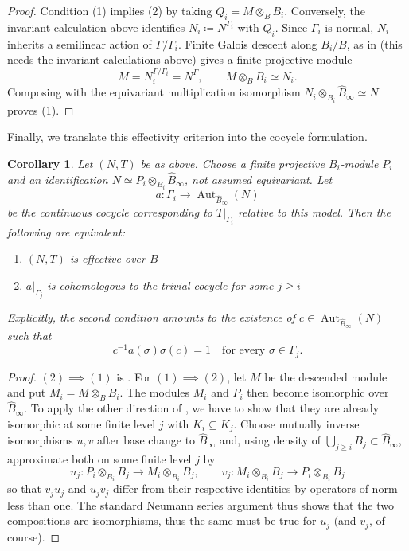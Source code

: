 \documentclass[10pt,twoside]{article}
\numberwithin{equation}{section}
\theoremstyle{plain}
\newtheorem{mycor}[mythm]{Corollary}
\theoremstyle{definition}
\DeclareMathOperator{\Aut}{Aut}
\begin{document}
\begin{proof}
Condition (1) implies (2) by taking \(Q_i=M\otimes_B B_i\). Conversely, the invariant calculation above identifies \(N_i\coloneqq N^{\Gamma_i}\) with \(Q_i\). Since \(\Gamma_i\) is normal, \(N_i\) inherits a semilinear action of \(\Gamma/\Gamma_i\). Finite Galois descent along \(B_i/B\), as in \cite[0CDQ and 058S]{Stacks} (this needs the invariant calculations above) gives a finite projective module
\[
M=N_i^{\Gamma/\Gamma_i}=N^\Gamma,
\qquad M\otimes_B B_i\simeq N_i.
\]
Composing with the equivariant multiplication isomorphism \(N_i\otimes_{B_i}\hat B_\infty\simeq N\) proves (1).
\end{proof}

Finally, we translate this effectivity criterion into the cocycle formulation.
\begin{mycor}\label{proposalLocalTriviality}
Let \((N,T)\) be as above. Choose a finite projective \(B_i\)-module \(P_i\) and an identification \(N\simeq P_i\otimes_{B_i}\hat B_\infty\), not assumed equivariant. Let
\[
a\colon\Gamma_i\longrightarrow\Aut_{\hat B_\infty}(N)
\]
be the continuous cocycle corresponding to \(T|_{\Gamma_i}\) relative to this model. Then the following are equivalent:
\begin{enumerate}
\item \((N,T)\) is effective over \(B\) 
\item \(a|_{\Gamma_j}\) is cohomologous to the trivial cocycle for some \(j\geq i\)
\end{enumerate}
Explicitly, the second condition amounts to the existence of \(c\in\Aut_{\hat B_\infty}(N)\) such that
\[
c^{-1}a(\sigma)\sigma(c)=1
\quad\text{for every }\sigma\in\Gamma_j.
\]
\end{mycor}

\begin{proof}
\((2)\implies (1)\) is . For \((1)\implies (2)\), let \(M\) be the descended module and put \(M_i=M\otimes_B B_i\). The modules \(M_i\) and \(P_i\) then become isomorphic over \(\hat B_\infty\). To apply the other direction of , we have to show that they are already isomorphic at some finite level \(j\) with \(K_i\subseteq K_j\). Choose mutually inverse isomorphisms \(u,v\) after base change to \(\hat B_\infty\) and, using density of \(\bigcup_{j\geq i}B_j\subset \hat B_\infty\), approximate both on some finite level \(j\) by
\[
u_j\colon P_i\otimes_{B_i}B_j\longrightarrow M_i\otimes_{B_i}B_j,
\qquad
v_j\colon M_i\otimes_{B_i}B_j\longrightarrow P_i\otimes_{B_i}B_j
\]
so that \(v_ju_j\) and \(u_jv_j\) differ from their respective identities by operators of norm less than one. The standard Neumann series argument thus shows that the two compositions are isomorphisms, thus the same must be true for \(u_j\) (and \(v_j\), of course).
\end{proof}
\end{document}
